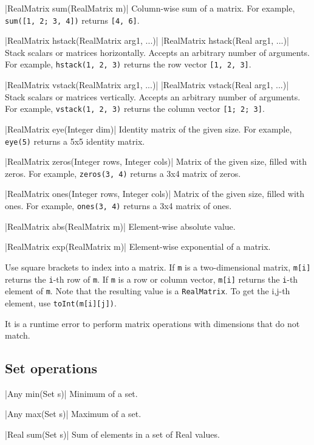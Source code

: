 \blog|RealMatrix sum(RealMatrix m)|
\myindent Column-wise sum of a matrix.
For example, \verb|sum([1, 2; 3, 4])| returns \verb|[4, 6]|.

\blog|RealMatrix hstack(RealMatrix arg1, ...)|
\blog|RealMatrix hstack(Real arg1, ...)|
\myindent Stack scalars or matrices horizontally. Accepts an arbitrary number
of
arguments.
For example, \verb|hstack(1, 2, 3)| returns the row vector {\tt [1, 2, 3]}.

\blog|RealMatrix vstack(RealMatrix arg1, ...)|
\blog|RealMatrix vstack(Real arg1, ...)|
\myindent Stack scalars or matrices vertically. Accepts an arbitrary number of
arguments.
For example, \verb|vstack(1, 2, 3)| returns the column vector {\tt [1; 2; 3]}.

\blog|RealMatrix eye(Integer dim)|
\myindent Identity matrix of the given size.
For example, \verb|eye(5)| returns a 5x5 identity matrix.

\blog|RealMatrix zeros(Integer rows, Integer cols)|
\myindent Matrix of the given size, filled with zeros.
For example, \verb|zeros(3, 4)| returns a 3x4 matrix of zeros.

\blog|RealMatrix ones(Integer rows, Integer cols)|
\myindent Matrix of the given size, filled with ones.
For example, \verb|ones(3, 4)| returns a 3x4 matrix of ones.

\blog|RealMatrix abs(RealMatrix m)|
\myindent Element-wise absolute value.

\blog|RealMatrix exp(RealMatrix m)|
\myindent Element-wise exponential of a matrix.

Use square brackets to index into a matrix. If \verb|m| is a two-dimensional
matrix, \verb|m[i]| returns the \verb|i|-th row of \verb|m|. If \verb|m| is a
row or column vector, \verb|m[i]| returns the \verb|i|-th element of \verb|m|.
Note that the resulting value is a \verb|RealMatrix|. To get the i,j-th
element, use \verb|toInt(m[i][j])|.

It is a runtime error to perform matrix operations with dimensions that do not
match.


\subsection{Set operations}
\label{sec:builtin-set-ops}

\blog|Any min(Set s)|
\myindent Minimum of a set.

\blog|Any max(Set s)|
\myindent Maximum of a set.

\blog|Real sum(Set s)|
\myindent Sum of elements in a set of Real values.

